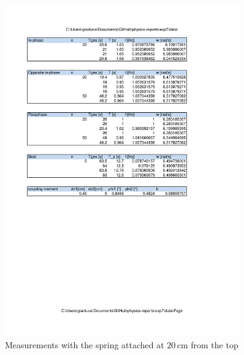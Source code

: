 \documentclass{scrreprt}
\newcommand{\unit}[1]{\ensuremath{\, \mathrm{#1}}}
\begin{document}
\begin{figure}[H]
	\centering
  \includegraphics[width=0.9\textwidth]{diag/readings20cm.pdf}
	\caption{Measurements with the spring attached at $20\unit{cm}$ from the top}
	\label{fig:20cm}
\end{figure}
\end{document}

